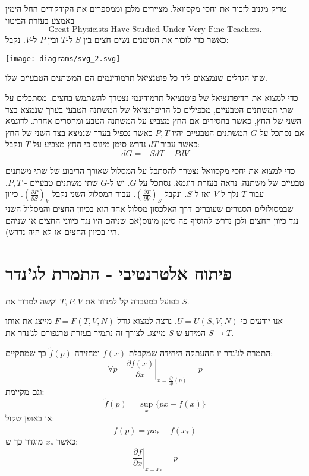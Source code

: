 \documentclass{tstextbook}
\begin{document}
טריק מגניב לזכור את יחסי מקסוואל. מציירים מלבן וממספרים את הקודקודים החל הימין באמצע בעזרת הביטוי
$$\text{Great Physicists Have Studied Under Very Fine Teachers.}$$
כאשר כדי לזכור את הסימנים נשים חצים בין \(S\) ל-\(T\) ובין \(P\) ל-\(V\). נקבל:

\texttt{[image: diagrams/svg\_2.svg]}
\begin{proposition}
שתי הגדלים שנמצאים ליד כל פוטנציאל תרמודינמים הם המשתנים הטבעיים שלו.

\end{proposition}
\begin{proposition}
כדי למצוא את הדיפרנציאל של פוטנציאל תרמודינמי נצטרך להשתמש בחצים. מסתכלים על שתי המשתנים הטבעיים, מכפילים כל הדיפרנציאל של המשתנה הטבעי בערך שנמצא בצד השני של החץ, כאשר בחסירים אם החץ מצביע על המשתנה הטבע ומחסרים אחרת. לדוגמא אם נסתכל על \(G\) המשתנים הטבעיים יהיו \(P,T\) כאשר נכפיל בערך שנמצא בצד השני של החץ כאשר עבור \(dT\) נדרש סימן מינוס כי החץ מצביע על \(T\) ונקבל:
$$dG=-SdT+PdV$$

\end{proposition}
\begin{proposition}
כדי למצוא את יחסי מקסוואל נצטרך להסתכל על המסלול שאורך הריבוע של שתי משתנים טבעיים של משתנה. נראה בעזרת דוגמא. נסתכל על \(G\). יש ל-\(G\) שתי משתנים טבעיים - \(P,T\). עבור \(T\) נלך ל-\(V\) ואז ל-\(S\). ונקבל \(\left( \frac{\partial T}{\partial V} \right)_{S}\). עבור המסלול השני נקבל \(\left( \frac{\partial P}{\partial S} \right)_{V}\). כיוון שבמסולולים הסגורים שעוברים דרך האלכסון מסלול אחד הוא בכיוון החצים והמסלול השני נגד כיוון החצים ולכן נדרש להוסיף פה סימן מינוס(אם שניהם היו נגד כיווני החצים או שניהם היו בכיוון החצים אז לא היה נדרש).

\end{proposition}
\section{פיתוח אלטרנטיבי - התמרת לג'נדר}

\begin{remark}
בפועל במעבדה קל למדוד את \(T,P,V\) וקשה למדוד את \(S\).

\end{remark}
אנו יודעים כי \(U=U(S,V,N)\). נרצה למצוא גודל \(F=F(T,V,N)\) מייצג את אותו המידע ש-\(S\) מייצג. לצורך זה נתמיר בעזרת טרנפורם לג'נדר את \(S\to T\).

\begin{proposition}
התמרת לג'נדר זו ההעתקה היחידה שמקבלת \(f(x)\) ומחזירה \(\tilde{f}(p)\) כך שמתקיים:
$$\forall p\quad \left.\frac{\partial f(x)}{\partial x}  \right\rvert _{x=\frac{\partial \tilde{f}}{\partial p} (p)}=p$$
וגם מקיימת:
$$\tilde{f}(p)=\sup _{x}\{ px-f(x) \} $$
או באופן שקול:
$$\tilde{f}(p)=px_{*}-f(x_{*})$$
כאשר \(x_{* }\) מוגדר כך ש:
$$\left.\frac{\partial f}{\partial x} \right\rvert_{x=x_{*}}=p $$

\end{proposition}
\end{document}
